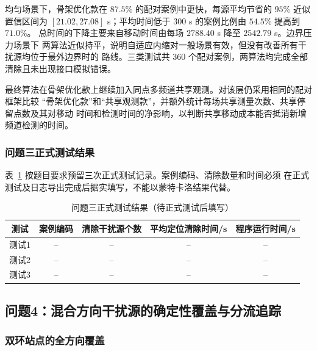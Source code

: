均匀场景下，骨架优化款在 $87.5\%$ 的配对案例中更快，每源平均节省的 $95\%$ 近似置信区间为
$[21.02,27.08]$ s；平均时间低于 $300$ s 的案例比例由 $54.5\%$ 提高到 $71.0\%$。
总时间的下降主要来自移动时间由每场 $2788.40$ s 降至 $2542.79$ s。边界压力场景下
两算法近似持平，说明自适应内缩对一般场景有效，但没有改善所有干扰源均位于最外边界时的
路线。三类测试共 $360$ 个配对案例，两算法均完成全部清除且未出现接口模拟错误。

最终算法在骨架优化款上继续加入同点多频道共享观测。对该层仍采用相同的配对框架比较
“骨架优化款”和“共享观测款”，并额外统计每场共享测量次数、共享停留点数及其对移动
时间和检测时间的净影响，以判断共享移动成本能否抵消新增频道检测的时间。



\subsubsection{问题三正式测试结果}

表~\ref{tab:p3-official} 按题目要求预留三次正式测试记录。案例编码、清除数量和时间必须
在正式测试及日志导出完成后据实填写，不能以蒙特卡洛结果代替。

\begin{table}[htbp]
\centering
\caption{问题三正式测试结果（待正式测试后填写）}
\label{tab:p3-official}
\begin{tabular}{ccccc}
\toprule
测试 & 案例编码 & 清除干扰源个数 & 平均定位清除时间/s & 程序运行时间/s \\
\midrule
测试1 & -- & -- & -- & -- \\
测试2 & -- & -- & -- & -- \\
测试3 & -- & -- & -- & -- \\
\bottomrule
\end{tabular}
\end{table}

\subsection{问题4：混合方向干扰源的确定性覆盖与分流追踪}

\subsubsection{双环站点的全方向覆盖}

